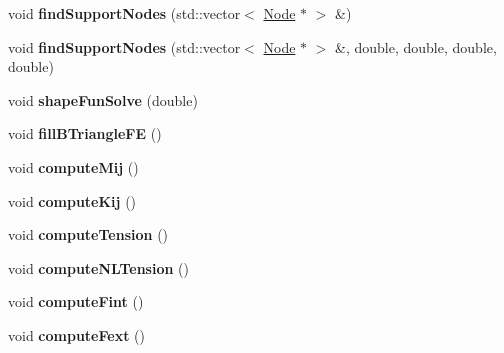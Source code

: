 \begin{CompactItemize}
\item 
\hypertarget{classmknix_1_1GaussPoint_c2054125b39bb3dbbd8a0d4bd1af4616}{
void \textbf{findSupportNodes} (std::vector$<$ \hyperlink{classmknix_1_1Node}{Node} $\ast$ $>$ \&)}
\label{classmknix_1_1GaussPoint_c2054125b39bb3dbbd8a0d4bd1af4616}

\item 
\hypertarget{classmknix_1_1GaussPoint_4dcef062e12361c9b1bb0d841fce8c64}{
void \textbf{findSupportNodes} (std::vector$<$ \hyperlink{classmknix_1_1Node}{Node} $\ast$ $>$ \&, double, double, double, double)}
\label{classmknix_1_1GaussPoint_4dcef062e12361c9b1bb0d841fce8c64}

\item 
\hypertarget{classmknix_1_1GaussPoint_2d420c603af59619d6ba040db76307a0}{
void \textbf{shapeFunSolve} (double)}
\label{classmknix_1_1GaussPoint_2d420c603af59619d6ba040db76307a0}

\item 
\hypertarget{classmknix_1_1GaussPoint_2c7657d7897b22f27427c612b67a2956}{
void \textbf{fillBTriangleFE} ()}
\label{classmknix_1_1GaussPoint_2c7657d7897b22f27427c612b67a2956}

\item 
\hypertarget{classmknix_1_1GaussPoint_9a01f1ad9df5669317e8aa41ab8be649}{
void \textbf{computeMij} ()}
\label{classmknix_1_1GaussPoint_9a01f1ad9df5669317e8aa41ab8be649}

\item 
\hypertarget{classmknix_1_1GaussPoint_ec3728abc07b0daa885b5a663916c95e}{
void \textbf{computeKij} ()}
\label{classmknix_1_1GaussPoint_ec3728abc07b0daa885b5a663916c95e}

\item 
\hypertarget{classmknix_1_1GaussPoint_0a7a504a291576ec95f43dec303d53c5}{
void \textbf{computeTension} ()}
\label{classmknix_1_1GaussPoint_0a7a504a291576ec95f43dec303d53c5}

\item 
\hypertarget{classmknix_1_1GaussPoint_7c28e0e337b7db0c44b651f235a1c0c3}{
void \textbf{computeNLTension} ()}
\label{classmknix_1_1GaussPoint_7c28e0e337b7db0c44b651f235a1c0c3}

\item 
\hypertarget{classmknix_1_1GaussPoint_88e2b56ce3f05d609307e858de4d52dc}{
void \textbf{computeFint} ()}
\label{classmknix_1_1GaussPoint_88e2b56ce3f05d609307e858de4d52dc}

\item 
\hypertarget{classmknix_1_1GaussPoint_7bfb2560bce7b5eb2ee9e5245e691976}{
void \textbf{computeFext} ()}
\label{classmknix_1_1GaussPoint_7bfb2560bce7b5eb2ee9e5245e691976}


\end{CompactItemize}
